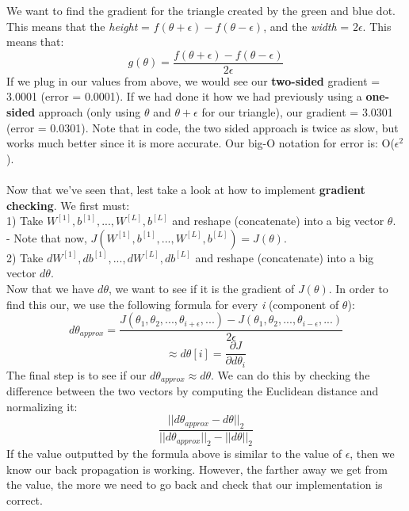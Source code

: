 \documentclass[11pt, a4paper]{article}
\begin{document}
\begin{spacing}{1.1}
	We want to find the gradient for the triangle created by the green and blue dot. This means that the \textit{height} = $f(\theta+\epsilon) - f(\theta-\epsilon)$, and the \textit{width} = $2\epsilon$. This means that: $$ g(\theta) = \frac{f(\theta+\epsilon) - f(\theta-\epsilon)}{2\epsilon} $$ 
	If we plug in our values from above, we would see our \textbf{two-sided} gradient = 3.0001 (error = 0.0001). If we had done it how we had previously using a \textbf{one-sided} approach (only using $\theta$ and $\theta+\epsilon$ for our triangle), our gradient = 3.0301 (error = 0.0301). Note that in code, the two sided approach is twice as slow, but works much better since it is more accurate. Our big-O notation for error is: O($\epsilon^2$). \\~\\
	Now that we've seen that, lest take a look at how to implement \textbf{gradient checking}. We first must:  \\
	\hspace*{3mm} 1) Take $W^{[1]}, b^{[1]},..., W^{[L]}, b^{[L]}$ and reshape (concatenate) into a big vector $\theta$. \\
	\hspace*{7mm} - Note that now, $J(W^{[1]}, b^{[1]},..., W^{[L]}, b^{[L]}) = J(\theta)$. \\
	\hspace*{3mm} 2) Take $dW^{[1]}, db^{[1]},..., dW^{[L]}, db^{[L]}$ and reshape (concatenate) into a big vector $d\theta$. \vspace*{1mm}\\
	Now that we have $d\theta$, we want to see if it is the gradient of $J(\theta)$. In order to find this our, we use the following formula for every \textit{i} (component of $\theta$): $$ d\theta_{approx} = \frac{J(\theta_1, \theta_2,...,\theta_{i+\epsilon},...) - J(\theta_1, \theta_2,...,\theta_{i-\epsilon},...)}{2\epsilon} $$ $$ \approx d\theta[i] = \frac{\partial J}{\partial d\theta_i}$$ 
	The final step is to see if our $d\theta_{approx} \approx d\theta$. We can do this by checking the difference between the two vectors by computing the Euclidean distance and normalizing it: $$ \frac{||d\theta_{approx} - d\theta||_2}{||d\theta_{approx}||_2 - ||d\theta||_2}$$
	If the value outputted by the formula above is similar to the value of $\epsilon$, then we know our back propagation is working. However, the farther away we get from the value, the more we need to go back and check that our implementation is correct. \vspace*{1mm} \\

\end{spacing}
\end{document}
